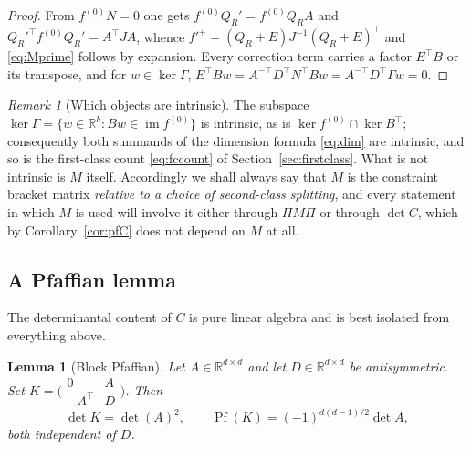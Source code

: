 \documentclass[12pt]{article}
\theoremstyle{plain}
\newtheorem{lemma}[theorem]{Lemma}
\theoremstyle{definition}
\theoremstyle{remark}
\newtheorem{remark}[theorem]{Remark}
\newcommand{\R}{\mathbb{R}}
\DeclareMathOperator{\im}{im}
\DeclareMathOperator{\Pf}{Pf}
\begin{document}
	\begin{proof}
		From $f^{(0)}N=0$ one gets $f^{(0)}Q_{R}'=f^{(0)}Q_{R}A$ and
		$Q_{R}'^{\top}f^{(0)}Q_{R}'=A^{\top}JA$, whence
		$f'^{+}=(Q_{R}+E)J^{-1}(Q_{R}+E)^{\top}$ and \eqref{eq:Mprime} follows by
		expansion. Every correction term carries a factor $E^{\top}B$ or its transpose,
		and for $w\in\ker\Gamma$,
		$E^{\top}Bw=A^{-\top}D^{\top}N^{\top}Bw=A^{-\top}D^{\top}\Gamma w=0$.
	\end{proof}
	
	\begin{remark}[Which objects are intrinsic]
		\label{rem:intrinsic}
		The subspace $\ker\Gamma=\{w\in\R^{k}:Bw\in\im f^{(0)}\}$ is intrinsic, as is
		$\ker f^{(0)}\cap\ker B^{\top}$; consequently both summands of the dimension
		formula \eqref{eq:dim} are intrinsic, and so is the first-class count
		\eqref{eq:fccount} of Section~\ref{sec:firstclass}. What is not intrinsic is
		$M$ itself. Accordingly we shall always say that $M$ is the constraint bracket
		matrix \emph{relative to a choice of second-class splitting}, and every
		statement in which $M$ is used will involve it either through $\Pi M\Pi$ or
		through $\det C$, which by Corollary~\ref{cor:pfC} does not depend on $M$ at
		all.
	\end{remark}
	
	\subsection{A Pfaffian lemma}
	\label{sec:pfaffian}
	
	The determinantal content of $C$ is pure linear algebra and is best isolated
	from everything above.
	
	\begin{lemma}[Block Pfaffian]
		\label{lem:pf}
		Let $A\in\R^{d\times d}$ and let $D\in\R^{d\times d}$ be antisymmetric. Set
		$K=\bigl(\begin{smallmatrix}0&A\\-A^{\top}&D\end{smallmatrix}\bigr)$. Then
		\begin{equation}
			\det K=\det(A)^{2},
			\qquad
			\Pf(K)=(-1)^{d(d-1)/2}\det A ,
			\label{eq:pflemma}
		\end{equation}
		both independent of $D$.
	\end{lemma}
	
\end{document}
